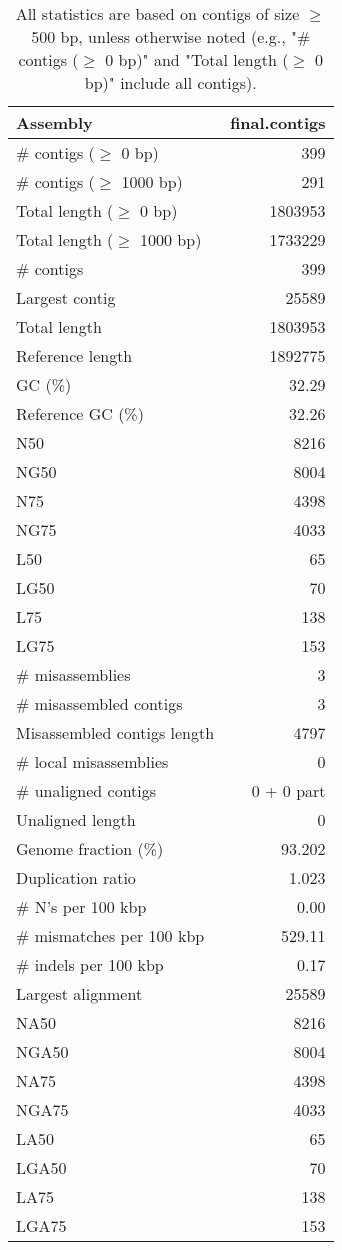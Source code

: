 \documentclass[12pt,a4paper]{article}
\begin{document}
\begin{table}[ht]
\begin{center}
\caption{All statistics are based on contigs of size $\geq$ 500 bp, unless otherwise noted (e.g., "\# contigs ($\geq$ 0 bp)" and "Total length ($\geq$ 0 bp)" include all contigs).}
\begin{tabular}{|l*{1}{|r}|}
\hline
Assembly & final.contigs \\ \hline
\# contigs ($\geq$ 0 bp) & 399 \\ \hline
\# contigs ($\geq$ 1000 bp) & 291 \\ \hline
Total length ($\geq$ 0 bp) & 1803953 \\ \hline
Total length ($\geq$ 1000 bp) & 1733229 \\ \hline
\# contigs & 399 \\ \hline
Largest contig & 25589 \\ \hline
Total length & 1803953 \\ \hline
Reference length & 1892775 \\ \hline
GC (\%) & 32.29 \\ \hline
Reference GC (\%) & 32.26 \\ \hline
N50 & 8216 \\ \hline
NG50 & 8004 \\ \hline
N75 & 4398 \\ \hline
NG75 & 4033 \\ \hline
L50 & 65 \\ \hline
LG50 & 70 \\ \hline
L75 & 138 \\ \hline
LG75 & 153 \\ \hline
\# misassemblies & 3 \\ \hline
\# misassembled contigs & 3 \\ \hline
Misassembled contigs length & 4797 \\ \hline
\# local misassemblies & 0 \\ \hline
\# unaligned contigs & 0 + 0 part \\ \hline
Unaligned length & 0 \\ \hline
Genome fraction (\%) & 93.202 \\ \hline
Duplication ratio & 1.023 \\ \hline
\# N's per 100 kbp & 0.00 \\ \hline
\# mismatches per 100 kbp & 529.11 \\ \hline
\# indels per 100 kbp & 0.17 \\ \hline
Largest alignment & 25589 \\ \hline
NA50 & 8216 \\ \hline
NGA50 & 8004 \\ \hline
NA75 & 4398 \\ \hline
NGA75 & 4033 \\ \hline
LA50 & 65 \\ \hline
LGA50 & 70 \\ \hline
LA75 & 138 \\ \hline
LGA75 & 153 \\ \hline
\end{tabular}
\end{center}
\end{table}
\end{document}
